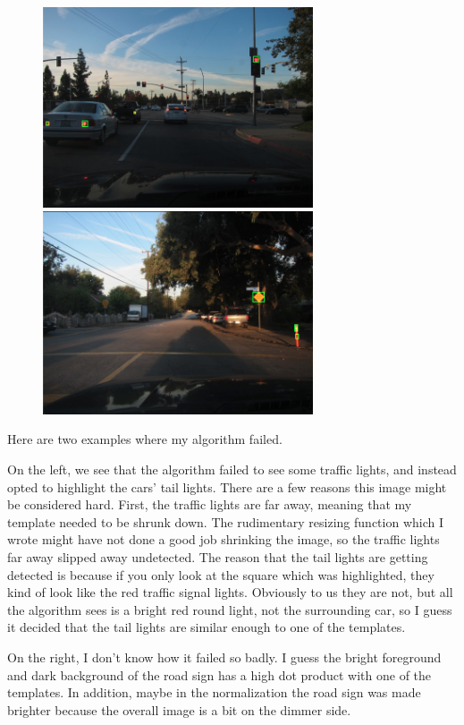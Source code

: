 \documentclass[12pt,letterpaper]{article} \usepackage{fullpage}
\begin{document}
\begin{figure}[htp]
    \centering
    \includegraphics[width=8cm]{img/bad1.png}
    \includegraphics[width=8cm]{img/bad2.png}
\end{figure}

Here are two examples where my algorithm failed.

On the left, we see that the algorithm failed to see some traffic lights, and instead
opted to highlight the cars' tail lights. There are a few reasons this image might be
considered hard. First, the traffic lights are far away, meaning that my template
needed to be shrunk down. The rudimentary resizing function which I wrote might have not
done a good job shrinking the image, so the traffic lights far away slipped away undetected.
The reason that the tail lights are getting detected is because if you only look at
the square which was highlighted, they kind of look like the red traffic signal lights.
Obviously to us they are not, but all the algorithm sees is a bright red round light, not
the surrounding car, so I guess it decided that the tail lights are similar enough to
one of the templates.

On the right, I don't know how it failed so badly. I guess the bright foreground and
dark background of the road sign has a high dot product with one of the templates.
In addition, maybe in the normalization the road sign was made brighter because the
overall image is a bit on the dimmer side.\\
\end{document}
